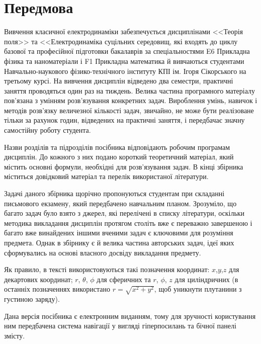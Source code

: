 
\introtrue
\chapter*{Передмова}

Вивчення класичної електродинаміки забезпечується дисциплінами <<Тео\-рія поля>> та <<Електродинаміка суцільних середовищ, які входять до циклу базової та професійної підготовки бакалаврів за спеціальностями E6 Прикладна фізика та наноматеріали і F1 Прикладна математика й вивчаються студентами Навчально-наукового фізико-технічного інституту КПІ ім. Ігоря Сікорського на третьому курсі. На вивчення дисциплін відведено два семестри, практичні заняття проводяться один раз на тиждень. Велика частина програмного матеріалу пов'язана з умінням розв'язування конкретних задач. Вироблення умінь, навичок і методів розв'язку величезної кількості задач, звичайно, не може бути реалізоване тільки за рахунок годин, відведених на практичні заняття, і передбачає значну самостійну роботу студента.

Назви розділів та підрозділів посібника відповідають робочим програмам дисциплін. До кожного з них подано короткий теоретичний матеріал, який містить основні формули, необхідні для розв'язування задач. В кінці збірника міститься довідковий матеріал та перелік використаної літератури.


Задачі даного збірника щорічно пропонуються студентам при складанні письмового екзамену, який передбачено навчальним планом. Зрозуміло, що багато задач було взято з джерел, які перелічені в списку літератури, оскільки методика викладання дисциплін протягом  століть вже є переважно завершеною і багато вже винайдених іншими вченими задач є ключовими для розуміння предмета. Однак в збірнику є й велика частина авторських задач, ідеї яких сформувались на основі власного досвіду викладання предмету.

Як правило, в тексті використовуються такі позначення координат: $x$,$y$,$z$ для декартових координат;  $r$, $\theta$, $\phi$ для сферичних та  $r$, $\phi$, $z$ для циліндричних (в останніх позначеннях використано $r=\sqrt{x^2+y^2}$,  щоб уникнути плутанини з густиною заряду).

Дана версія посібника є електронним виданням, тому для зручності користування ним передбачена система навігації у вигляді гіперпосилань та бічної панелі змісту.

%
\introfalse





